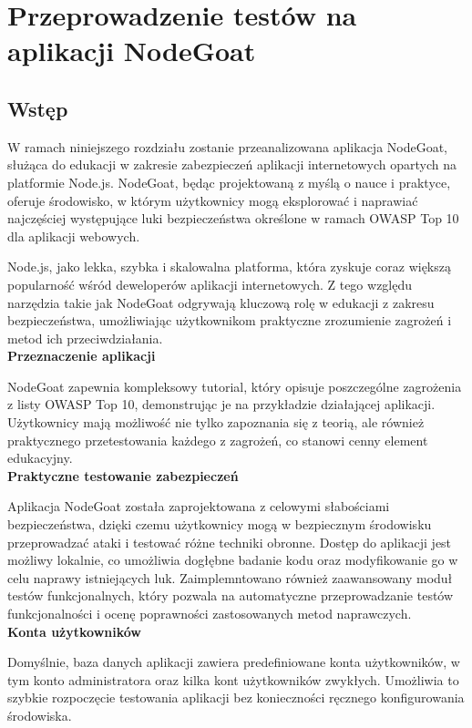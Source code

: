 \chapter{Przeprowadzenie testów na aplikacji NodeGoat}

\section{Wstęp}
\label{sec:wstep}
W ramach niniejszego rozdziału zostanie przeanalizowana aplikacja NodeGoat, służąca do edukacji w zakresie zabezpieczeń aplikacji internetowych opartych na platformie Node.js. NodeGoat, będąc projektowaną z myślą o nauce i praktyce, oferuje środowisko, w którym użytkownicy mogą eksplorować i naprawiać najczęściej występujące luki bezpieczeństwa określone w ramach OWASP Top 10 dla aplikacji webowych.

Node.js, jako lekka, szybka i skalowalna platforma, która zyskuje coraz większą popularność wśród deweloperów aplikacji internetowych. Z tego względu narzędzia takie jak NodeGoat odgrywają kluczową rolę w edukacji z zakresu bezpieczeństwa, umożliwiając użytkownikom praktyczne zrozumienie zagrożeń i metod ich przeciwdziałania.
\\

\textbf{Przeznaczenie aplikacji}

NodeGoat zapewnia kompleksowy tutorial, który opisuje poszczególne zagrożenia z listy OWASP Top 10, demonstrując je na przykładzie działającej aplikacji. Użytkownicy mają możliwość nie tylko zapoznania się z teorią, ale również praktycznego przetestowania każdego z zagrożeń, co stanowi cenny element edukacyjny.
\\

\textbf{Praktyczne testowanie zabezpieczeń}

Aplikacja NodeGoat została zaprojektowana z celowymi słabościami bezpieczeństwa, dzięki czemu użytkownicy mogą w bezpiecznym środowisku przeprowadzać ataki i testować różne techniki obronne. Dostęp do aplikacji jest możliwy lokalnie, co umożliwia dogłębne badanie kodu oraz modyfikowanie go w celu naprawy istniejących luk. Zaimplemntowano również zaawansowany moduł testów funkcjonalnych, który pozwala na automatyczne przeprowadzanie testów funkcjonalności i ocenę poprawności zastosowanych metod naprawczych.
\\

\textbf{Konta użytkowników}

Domyślnie, baza danych aplikacji zawiera predefiniowane konta użytkowników, w tym konto administratora oraz kilka kont użytkowników zwykłych. Umożliwia to szybkie rozpoczęcie testowania aplikacji bez konieczności ręcznego konfigurowania środowiska.\\

